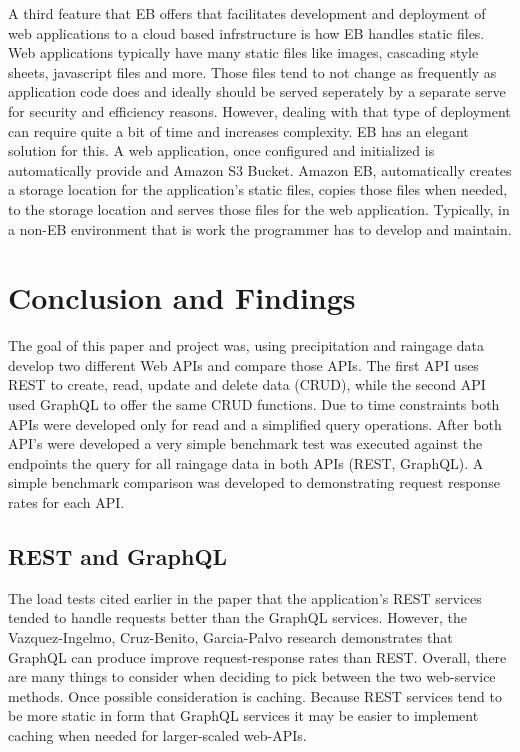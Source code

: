 A third feature that EB offers that facilitates development and deployment of 
web applications to a cloud based infrstructure is how EB handles static 
files.  Web applications typically have many static files like images, 
cascading style sheets, javascript files and more.  Those files tend to not 
change as frequently as application code does and ideally should be served 
seperately by a separate serve for security and efficiency reasons.  However, 
dealing with that type of deployment can require quite a bit of time and 
increases complexity.  EB has an elegant solution for this.  A web 
application, once configured and initialized is automatically provide and 
Amazon S3 Bucket\cite{S3Bucket2018}.  Amazon EB, automatically creates a 
storage location for the application's static files, copies those files when 
needed, to the storage location and serves those files for the web 
application.  Typically, in a non-EB environment that is work the programmer 
has to develop and maintain.

\section{Conclusion and Findings}
The goal of this paper and project was, using precipitation and raingage data 
develop two different Web APIs and compare those APIs.  The first API uses 
REST to create, read, update and delete data (CRUD), while the second API used 
GraphQL to offer the same CRUD functions.  Due to time constraints both APIs 
were developed only for read and a simplified query operations.  After both 
API's were developed a very simple benchmark test was executed against the 
endpoints the query for all raingage data in both APIs (REST, GraphQL).  A 
simple benchmark comparison was developed to demonstrating request response 
rates for each API.

\subsection{REST and GraphQL}
The load tests cited earlier in the paper that the application's REST services 
tended to handle requests better than the GraphQL services.  However, the 
Vazquez-Ingelmo, Cruz-Benito, Garcia-Palvo\cite{hid505Vzquez2017} research 
demonstrates that GraphQL can produce improve request-response rates than 
REST.  Overall, there are many things to consider when deciding to pick 
between the two web-service methods.  Once possible consideration is caching.  
Because REST services tend to be more static in form that GraphQL services it 
may be easier to implement caching when needed for larger-scaled web-APIs.

